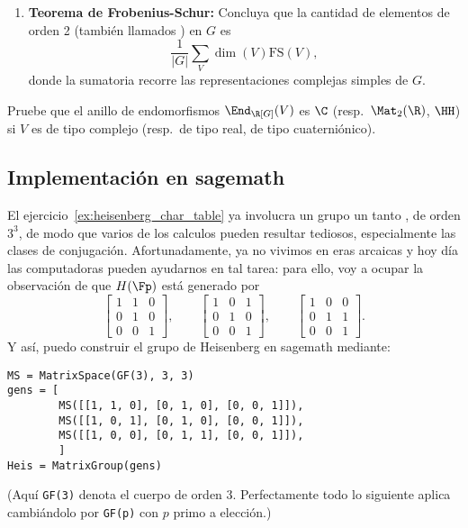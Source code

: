 \documentclass[11pt, reqno]{amsart}
\begin{document}
\begin{enumerate}
\begin{enumerate}
			\item \textbf{Teorema de Frobenius-Schur:}
				Concluya que la cantidad de elementos de orden 2 (también llamados ) en $G$ es
				\[
					\frac{1}{|G|}\sum_V \dim(V)\mathrm{FS}(V),
				\]
				donde la sumatoria recorre las representaciones complejas simples de $G$.
		\end{enumerate}

		\begin{prob}
			Pruebe que el anillo de endomorfismos $\End_{\R[G]}(V)$ es $\C$ (resp.\ $\Mat_2(\R)$, $\HH$) si $V$ es de tipo complejo
			(resp.\ de tipo real, de tipo cuaterniónico).
		\end{prob}
\end{enumerate}

\begin{additional}
\appendix

\section{Implementación en \textsf{sagemath}}
El ejercicio~\ref{ex:heisenberg_char_table} ya involucra un grupo un tanto , de orden $3^3$, de modo que varios de los calculos pueden resultar tediosos,
especialmente las clases de conjugación.
Afortunadamente, ya no vivimos en eras arcaicas y hoy día las computadoras pueden ayudarnos en tal tarea:
para ello, voy a ocupar la observación de que $H(\Fp)$ está generado por
\[
	\begin{bmatrix}
		1 & 1 & 0 \\
		0 & 1 & 0 \\
		0 & 0 & 1
	\end{bmatrix}, \qquad
	\begin{bmatrix}
		1 & 0 & 1 \\
		0 & 1 & 0 \\
		0 & 0 & 1
	\end{bmatrix}, \qquad
	\begin{bmatrix}
		1 & 0 & 0 \\
		0 & 1 & 1 \\
		0 & 0 & 1
	\end{bmatrix}.
\]
Y así, puedo construir el grupo de Heisenberg en \textsf{sagemath} mediante:
\begin{verbatim}
MS = MatrixSpace(GF(3), 3, 3)
gens = [
        MS([[1, 1, 0], [0, 1, 0], [0, 0, 1]]),
        MS([[1, 0, 1], [0, 1, 0], [0, 0, 1]]),
        MS([[1, 0, 0], [0, 1, 1], [0, 0, 1]]),
        ]
Heis = MatrixGroup(gens)
\end{verbatim}
(Aquí \texttt{GF(3)} denota el cuerpo de orden 3. Perfectamente todo lo siguiente aplica cambiándolo por \texttt{GF(p)} con $p$ primo a elección.)


\end{additional}
\end{document}
